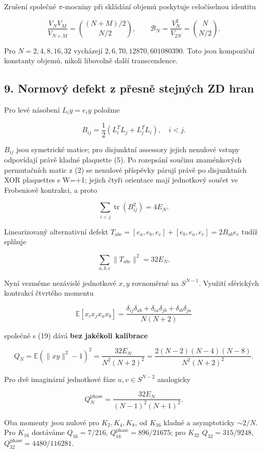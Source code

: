 \documentclass[
  10pt,
]{article}
\begin{document}
Zrušení společné \(\pi\)-mocniny při skládání objemů poskytuje
celočíselnou identitu

\[
\frac{V_N V_M}{V_{N+M}}=\binom{(N+M)/2}{N/2},\qquad
\mathcal B_N=\frac{V_N^2}{V_{2N}}=\binom N{N/2}.
\tag{17}
\]

Pro \(N=2,4,8,16,32\) vycházejí \(2,6,70,12870,601080390\). Toto jsou
kompoziční konstanty objemů, nikoli libovolně další transcendence.

\subsection{9. Normový defekt z přesně stejných ZD
hran}\label{normovuxfd-defekt-z-pux159esnux11b-stejnuxfdch-zd-hran}

Pro levé násobení \(L_i y=e_i y\) položme

\[
B_{ij}=\frac12(L_i^TL_j+L_j^TL_i),\quad i<j.
\tag{18}
\]

\(B_{ij}\) jsou symetrické matice; pro disjunktní assessory jejich
nenulové vstupy odpovídají právě kladné plaquette (5). Po rozepsání
součinu znaménkových permutačních matic z (2) se nenulové příspěvky
párují právě po disjunktních XOR plaquettes s W=+1; jejich čtyři
orientace mají jednotkový součet ve Frobeniově kontrakci, a proto

\[
\sum_{i<j}\operatorname{tr}(B_{ij}^2)=4E_N.
\tag{19}
\]

Linearizovaný alternativní defekt
\(T_{abc}=[e_a,e_b,e_c]+[e_b,e_a,e_c]=2B_{ab}e_c\) tudíž splňuje

\[
\sum_{a,b,c}\|T_{abc}\|^2=32E_N.
\tag{20}
\]

Nyní vezměme nezávislé jednotkové \(x,y\) rovnoměrné na \(S^{N-1}\).
Využití sférických kontrakcí čtvrtého momentu

\[
\mathbb E[x_ix_jx_ax_b]=\frac{\delta_{ij}\delta_{ab}+\delta_{ia}\delta_{jb}+\delta_{ib}\delta_{ja}}{N(N+2)}
\]

společně s (19) dává \textbf{bez jakékoli kalibrace}

\[
Q_N=\mathbb E(\|xy\|^2-1)^2
=\frac{32E_N}{N^2(N+2)^2}
=\frac{2(N-2)(N-4)(N-8)}{N^2(N+2)^2}.
\tag{21}
\]

Pro dvě imaginární jednotkové fáze \(u,v\in S^{N-2}\) analogicky

\[
Q_N^{\mathrm{phase}}=\frac{32E_N}{(N-1)^2(N+1)^2}.
\tag{22}
\]

Oba momenty jsou nulové pro \(K_2,K_4,K_8\), od \(K_{16}\) kladné a
asymptoticky \(\sim 2/N\). Pro \(K_{16}\) dostáváme \(Q_{16}=7/216\),
\(Q_{16}^{\mathrm{phase}}=896/21675\); pro \(K_{32}\)
\(Q_{32}=315/9248\), \(Q_{32}^{\mathrm{phase}}=4480/116281\).
\end{document}
